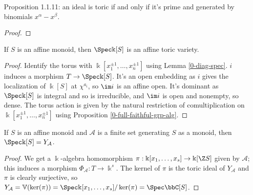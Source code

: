 \begin{proposition}
  \label{1-1-11-toric-ideal-gen-binomial}

  Proposition 1.1.11: an ideal is toric if and only if it's prime and generated by binomials $x^\alpha - x^\beta$.
\end{proposition}
\begin{proof}

\end{proof}


\begin{proposition}
  \label{1-1-14-aff-tor-var-spec-aff-mon-alg}
  \leanok

  If $S$ is an affine monoid, then $\Spec \Bbbk[S]$ is an affine toric variety.
\end{proposition}
\begin{proof}

  Identify the torus with $\Bbbk[x_1^{\pm1}, \dotsc, x_n^{\pm1}]$ using Lemma \ref{0-diag-spec}.
  $i$ induces a morphism $T \to \Spec \Bbbk[S]$. It's an open embedding as $i$ gives the localization of $\Bbbk[S]$ at $\chi^{a_i}$, so $\im i$ is an affine open. It's dominant as $\Spec \Bbbk[S]$ is integral and so is irreducible, and $\im i$ is open and nonempty, so dense. The torus action is given by the natural restriction of comultiplication on $\Bbbk[x_1^{\pm1}, \dotsc, x_n^{\pm1}]$ using Proposition \ref{0-full-faithful-grp-alg}.
\end{proof}


\begin{proposition}
  \label{1-1-14-spec-aff-mon-alg-eq-ya}

  If $S$ is an affine monoid and $\mathcal A$ is a finite set generating $S$ as a monoid, then $\Spec \Bbbk[S] = Y_{\mathcal A}$.
\end{proposition}
\begin{proof}

  We get a $\Bbbk$-algebra homomorphism $\pi : \Bbbk[x_1, \dotsc, x_s] \to \Bbbk[\Z S]$ given by $\mathcal A$; this induces a morphism $\Phi_{\mathcal A} : T \to \Bbbk^s$. The kernel of $\pi$ is the toric ideal of $Y_{\mathcal A}$ and $\pi$ is clearly surjective, so $Y_{\mathcal A} = \mathbb V(\ker(\pi)) = \Spec \Bbbk[x_1, \dotsc, x_s] / \ker(\pi) = \Spec \bbC[S]$.
\end{proof}



